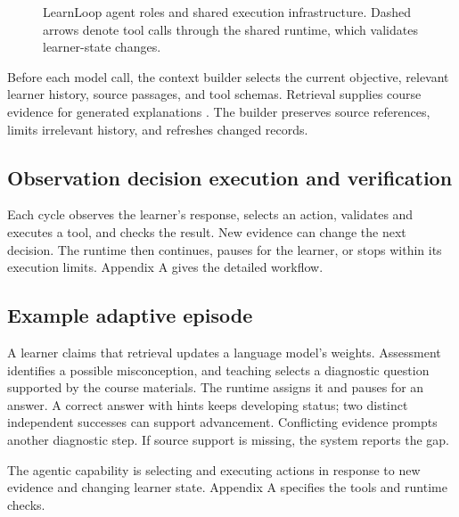 \documentclass{article}
\begin{document}
\begin{figure}[H]
\caption{LearnLoop agent roles and shared execution infrastructure. Dashed arrows denote tool calls through the shared runtime, which validates learner-state changes.}
\label{fig:architecture}
\end{figure}


Before each model call, the context builder selects the current objective, relevant learner history, source passages, and tool schemas. Retrieval supplies course evidence for generated explanations \citep{ref5}. The builder preserves source references, limits irrelevant history, and refreshes changed records.

\subsection{Observation decision execution and verification}

Each cycle observes the learner's response, selects an action, validates and executes a tool, and checks the result. New evidence can change the next decision. The runtime then continues, pauses for the learner, or stops within its execution limits. Appendix A gives the detailed workflow.

\subsection{Example adaptive episode}

A learner claims that retrieval updates a language model's weights. Assessment identifies a possible misconception, and teaching selects a diagnostic question supported by the course materials. The runtime assigns it and pauses for an answer. A correct answer with hints keeps developing status; two distinct independent successes can support advancement. Conflicting evidence prompts another diagnostic step. If source support is missing, the system reports the gap.

The agentic capability is selecting and executing actions in response to new evidence and changing learner state. Appendix A specifies the tools and runtime checks.
\end{document}
